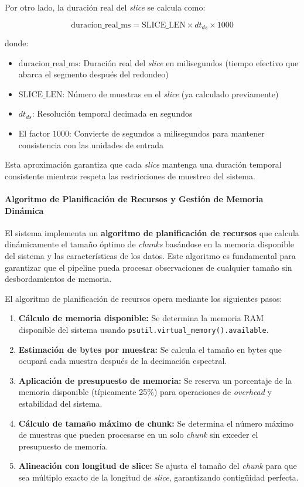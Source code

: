 Por otro lado, la duración real del \emph{slice} se calcula como:

\[
\text{duracion\_real\_ms} = \text{SLICE\_LEN} \times dt_{ds} \times 1000
\]

donde:
\begin{itemize}
    \item $\text{duracion\_real\_ms}$: Duración real del \emph{slice} en milisegundos (tiempo efectivo que abarca el segmento después del redondeo)
    \item $\text{SLICE\_LEN}$: Número de muestras en el \emph{slice} (ya calculado previamente)
    \item $dt_{ds}$: Resolución temporal decimada en segundos
    \item El factor $1000$: Convierte de segundos a milisegundos para mantener consistencia con las unidades de entrada
\end{itemize}

Esta aproximación garantiza que cada \emph{slice} mantenga una duración temporal consistente mientras respeta las restricciones de muestreo del sistema.

\paragraph{Algoritmo de Planificación de Recursos y Gestión de Memoria Dinámica}

El sistema implementa un \textbf{algoritmo de planificación de recursos} que calcula dinámicamente el tamaño óptimo de \emph{chunks} basándose en la memoria disponible del sistema y las características de los datos. Este algoritmo es fundamental para garantizar que el pipeline pueda procesar observaciones de cualquier tamaño sin desbordamientos de memoria.

El algoritmo de planificación de recursos opera mediante los siguientes pasos:

\begin{enumerate}
    \item \textbf{Cálculo de memoria disponible:} Se determina la memoria RAM disponible del sistema usando \texttt{psutil.virtual\_memory().available}.
    \item \textbf{Estimación de bytes por muestra:} Se calcula el tamaño en bytes que ocupará cada muestra después de la decimación espectral.
    \item \textbf{Aplicación de presupuesto de memoria:} Se reserva un porcentaje de la memoria disponible (típicamente 25\%) para operaciones de \emph{overhead} y estabilidad del sistema.
    \item \textbf{Cálculo de tamaño máximo de chunk:} Se determina el número máximo de muestras que pueden procesarse en un solo \emph{chunk} sin exceder el presupuesto de memoria.
    \item \textbf{Alineación con longitud de slice:} Se ajusta el tamaño del \emph{chunk} para que sea múltiplo exacto de la longitud de \emph{slice}, garantizando contigüidad perfecta.
\end{enumerate}


